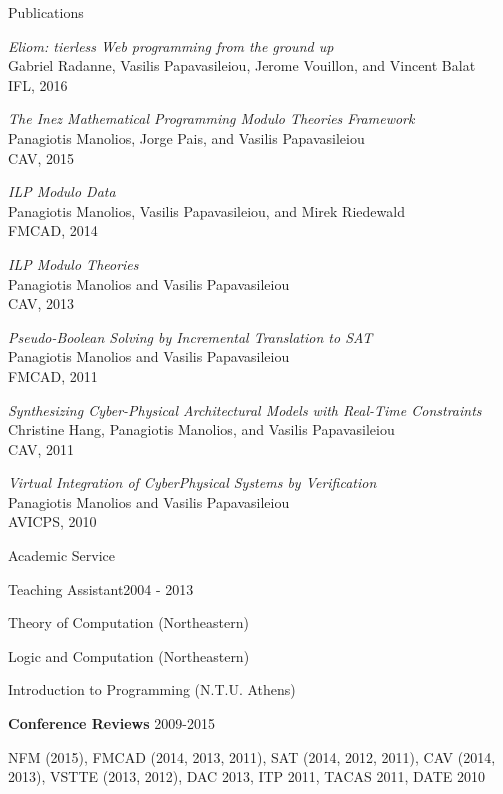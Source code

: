 \documentclass[11pt]{resume}
\begin{document}
\begin{rSection}{Publications}

  \emph{Eliom: tierless Web programming from the ground up} \\
  Gabriel Radanne, Vasilis Papavasileiou, Jerome Vouillon, and Vincent
  Balat \\
  IFL, 2016 

  \emph{The Inez Mathematical Programming Modulo Theories Framework} \\
  Panagiotis Manolios, Jorge Pais, and Vasilis Papavasileiou \\
  CAV, 2015

  \emph{ILP Modulo Data} \\
  Panagiotis Manolios, Vasilis Papavasileiou, and Mirek Riedewald \\
  FMCAD, 2014

  \emph{ILP Modulo Theories} \\
  Panagiotis Manolios and Vasilis Papavasileiou \\
  CAV, 2013

  \emph{Pseudo-Boolean Solving by Incremental Translation to SAT} \\
  Panagiotis Manolios and Vasilis Papavasileiou \\
  FMCAD, 2011

  \emph{Synthesizing Cyber-Physical Architectural Models with Real-Time Constraints} \\
  Christine Hang, Panagiotis Manolios, and Vasilis Papavasileiou \\
  CAV, 2011

  \emph{Virtual Integration of CyberPhysical Systems by Verification} \\
  Panagiotis Manolios and Vasilis Papavasileiou \\
  AVICPS, 2010

\end{rSection}

\begin{rSection}{Academic Service}

  \begin{rSubsection}{Teaching Assistant}{2004 - 2013}{}{}
  \item Theory of Computation (Northeastern)
  \item Logic and Computation (Northeastern)
  \item Introduction to Programming (N.T.U. Athens)
  \end{rSubsection}

  \textbf{Conference Reviews} \hfill 2009-2015 %

  NFM (2015), FMCAD (2014, 2013, 2011), SAT (2014, 2012, 2011), CAV
  (2014, 2013), VSTTE (2013, 2012), DAC 2013, ITP 2011, TACAS 2011,
  DATE 2010

\end{rSection}
\end{document}
